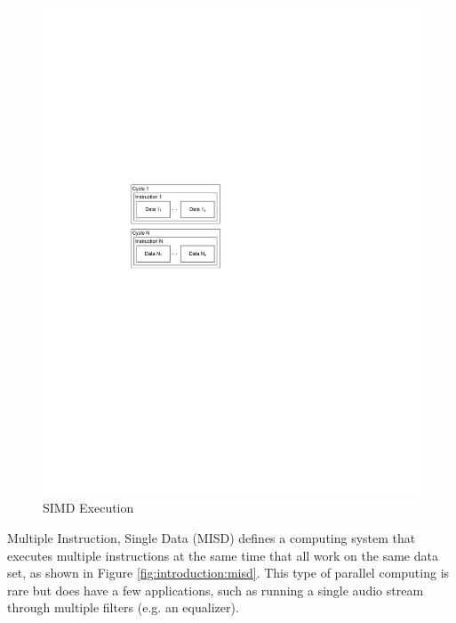 \begin{figure}[ptb]
	\begin{centering}
		\includegraphics{Introduction/Figures/introduction-simd.pdf}
		\caption{SIMD Execution}
		\label{fig:introduction:simd}
	\end{centering}
\end{figure}

Multiple Instruction, Single Data (MISD) defines a computing system that executes multiple instructions at the same time that all work on the same data set, as shown in Figure \ref{fig:introduction:misd}. This type of parallel computing is rare but does have a few applications, such as running a single audio stream through multiple filters (e.g. an equalizer).

